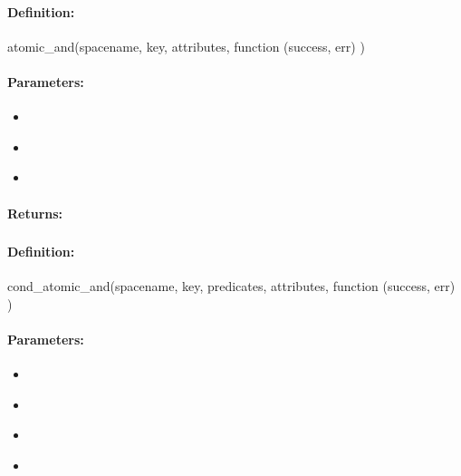 \paragraph{Definition:}
\begin{javascriptcode}
atomic_and(spacename, key, attributes, function (success, err) {})
\end{javascriptcode}
\paragraph{Parameters:}
\begin{itemize}[noitemsep]
\item {}\\

\item {}\\

\item {}\\

\end{itemize}

\paragraph{Returns:}


\pagebreak
\subsubsection{}
\label{api:nodejs:cond_atomic_and}


\paragraph{Definition:}
\begin{javascriptcode}
cond_atomic_and(spacename, key, predicates, attributes, function (success, err) {})
\end{javascriptcode}
\paragraph{Parameters:}
\begin{itemize}[noitemsep]
\item {}\\

\item {}\\

\item {}\\

\item {}\\

\end{itemize}

